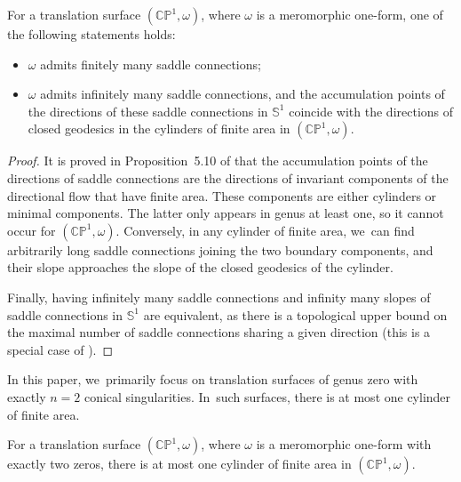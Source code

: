 \begin{prop}\label{prop:INFINITE-SC-Chara}
For a translation surface $(\mathbb{CP}^{1},\omega)$, where $\omega$ is a meromorphic one-form, one of the following statements holds:
\begin{itemize}
\item $\omega$ admits finitely many saddle connections;
\item $\omega$ admits infinitely many saddle connections, and the accumulation points of the directions of these saddle connections in $\mathbb{S}^{1}$ coincide with the directions of closed geodesics in the cylinders of finite area in $(\mathbb{CP}^{1},\omega)$.
\end{itemize}
\end{prop}

\begin{proof}
It is proved in Proposition~5.10 of \cite{tahar} that the accumulation points of the directions of saddle connections are the directions of invariant components of the directional flow that have finite area. These components are either cylinders or minimal components. The latter only appears in genus at least one, so it cannot occur for $(\mathbb{CP}^{1},\omega)$. Conversely, in any cylinder of finite area, we~can find arbitrarily long saddle connections joining the two boundary components, and their slope approaches the slope of the closed geodesics of the cylinder.

Finally, having infinitely many saddle connections and infinity many slopes of saddle connections in $\mathbb{S}^{1}$ are equivalent, as there is a topological upper bound on the maximal number of saddle connections sharing a given direction (this is a special case of \cite[Prop.\,7.6]{tahar}).
\end{proof}

In this paper, we~primarily focus on translation surfaces of genus zero with exactly $n=2$ conical singularities. In~such surfaces, there is at most one cylinder of finite area.

\begin{prop}
For a translation surface $(\mathbb{CP}^{1},\omega)$, where $\omega$ is a meromorphic one-form with exactly two zeros, there is at most one cylinder of finite area in $(\mathbb{CP}^{1},\omega)$.
\end{prop}

